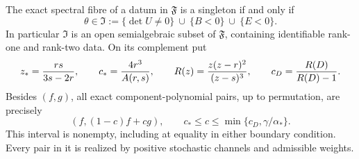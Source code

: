 \begin{theorem}
\label{thm:family-classification-v96}
The exact spectral fibre of a datum in $\mathfrak F$ is a singleton
if and only if
\begin{equation}\label{eq:identifiable-region-v96}
 \theta\in\mathfrak I
 :=\{\det U\ne0\}\ \cup\ \{B<0\}\ \cup\ \{E<0\}.
\end{equation}
In particular $\mathfrak I$ is an open semialgebraic subset of
$\mathfrak F$, containing identifiable rank-one and rank-two data.
On its complement put
\[
 z_*={rs\over3s-2r},\qquad c_*={4r^3\over A(r,s)},\qquad
 R(z)={z(z-r)^2\over(z-s)^3},\qquad c_D={R(D)\over R(D)-1}.
\]
Besides $(f,g)$, all exact component-polynomial pairs, up to
permutation, are precisely
\begin{equation}\label{eq:fibre-interval-v96}
 (f,(1-c)f+cg),\qquad
 c_*\le c\le\min\{c_D,\gamma/\alpha_*\}.
\end{equation}
This interval is nonempty, including at equality in either boundary
condition. Every pair in it is realized by positive stochastic
channels and admissible weights.
\end{theorem}
